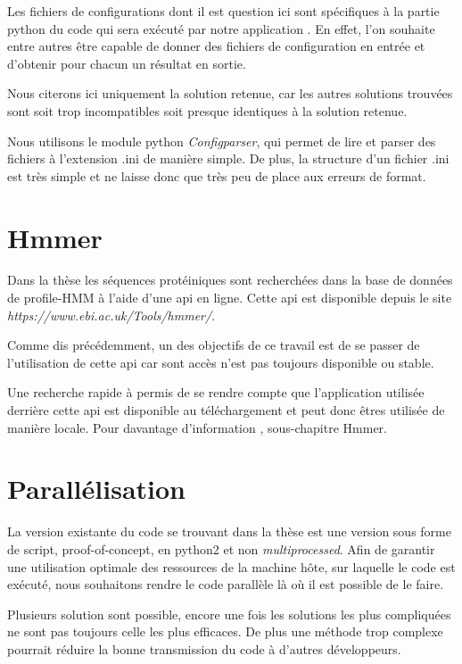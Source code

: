 Les fichiers de configurations dont il est question ici sont spécifiques à la partie python du code qui sera exécuté par notre application . En effet, l'on souhaite entre autres être capable de donner des fichiers de configuration en entrée et d'obtenir pour chacun un résultat en sortie.

Nous citerons ici uniquement la solution retenue, car les autres solutions trouvées sont soit trop incompatibles soit presque identiques à la solution retenue.

Nous utilisons le module python \emph{Configparser}, qui permet de lire et parser des fichiers à l'extension .ini de manière simple. De plus, la structure d'un fichier .ini est très simple et ne laisse donc que très peu de place aux erreurs de format.
 
 
\section{Hmmer}
Dans la thèse \thLeite les séquences protéiniques sont recherchées dans la base de données de profile-HMM à l'aide d'une \gls{api} en ligne. Cette \gls{api} est disponible depuis le site \emph{https://www.ebi.ac.uk/Tools/hmmer/}. 

Comme dis précédemment, un des objectifs de ce travail est de se passer de l'utilisation de cette \gls{api} car sont accès n'est pas toujours disponible ou stable.

Une recherche rapide à permis de se rendre compte que l'application utilisée derrière cette \gls{api} est disponible au téléchargement et peut donc êtres utilisée de manière locale. Pour davantage d'information , sous-chapitre Hmmer.


\section{Parallélisation}

La version existante du code se trouvant dans la thèse \thLeite est une version sous forme de script, proof-of-concept, en python2 et non \emph{multiprocessed}. Afin de garantir une utilisation optimale des ressources de la machine hôte, sur laquelle le code est exécuté, nous souhaitons rendre le code parallèle là où il est possible de le faire.

Plusieurs solution sont possible, encore une fois les solutions les plus compliquées ne sont pas toujours celle les plus efficaces. De plus une méthode trop complexe pourrait réduire la bonne transmission du code à d'autres développeurs.

